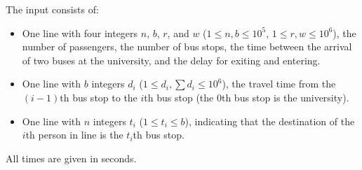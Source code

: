 
    The input consists of:
    \begin{itemize}
      \item One line with four integers $n$, $b$, $r$, and $w$ ($1\leq n, b \leq 10^5$, $1\leq r, w \leq 10^6$), the number of passengers, the number of bus stops, the time between the arrival of two buses at the university, and the delay for exiting and entering.
      \item One line with $b$ integers $d_{i}$ ($1 \le d_{i}, \sum d_{i} \leq 10^6$), the travel time from the $(i-1)$th bus stop to the $i$th bus stop (the $0$th bus stop is the university).
      \item One line with $n$ integers $t_{i}$ ($1 \leq t_{i} \leq b$), indicating that the destination of the $i$th person in line is the $t_i$th bus stop.
    \end{itemize}
    All times are given in seconds.
